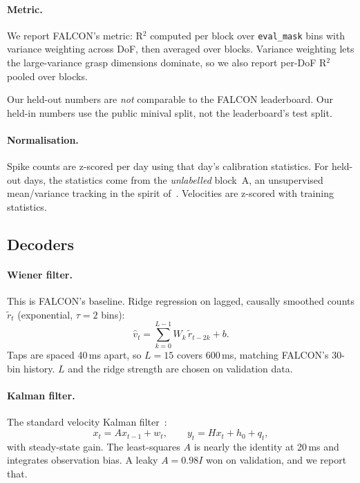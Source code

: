 \paragraph{Metric.} We report FALCON's metric: R$^2$ computed per block over
\texttt{eval\_mask} bins with variance weighting across DoF, then averaged over blocks.
Variance weighting lets the large-variance grasp dimensions dominate, so we also report
per-DoF R$^2$ pooled over blocks.

Our held-out numbers are \emph{not} comparable to the FALCON leaderboard. Our held-in
numbers use the public minival split, not the leaderboard's test split.

\paragraph{Normalisation.} Spike counts are z-scored per day using that day's
calibration statistics. For held-out days, the statistics come from the
\emph{unlabelled} block~A, an unsupervised mean/variance tracking in the spirit
of~\cite{jarosiewicz2015virtual}. Velocities are z-scored with training statistics.

\subsection{Decoders}
\paragraph{Wiener filter.} This is FALCON's baseline. Ridge regression on lagged,
causally smoothed counts $\tilde r_t$ (exponential, $\tau=2$ bins):
\begin{equation}
\hat v_t=\sum_{k=0}^{L-1}W_k\,\tilde r_{t-2k}+b .
\end{equation}
Taps are spaced 40\,ms apart, so $L=15$ covers 600\,ms, matching FALCON's 30-bin
history. $L$ and the ridge strength are chosen on validation data.

\paragraph{Kalman filter.} The standard velocity Kalman filter~\cite{wu2006bayesian}:
\begin{equation}
x_t=Ax_{t-1}+w_t,\qquad y_t=Hx_t+h_0+q_t ,
\end{equation}
with steady-state gain. The least-squares $A$ is nearly the identity at 20\,ms and
integrates observation bias. A leaky $A=0.98I$ won on validation, and we report that.

